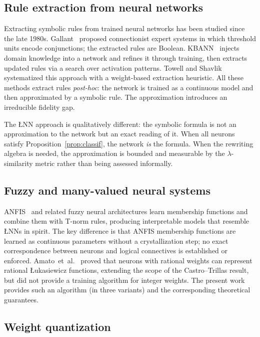 \documentclass[12pt,a4paper]{article}
\newcommand{\LNN}{\L{}NN}
\begin{document}
\subsection{Rule extraction from neural networks}

Extracting symbolic rules from trained neural networks has been studied since
the late 1980s.
Gallant~\cite{gallant1988} proposed connectionist expert systems in which
threshold units encode conjunctions; the extracted rules are Boolean.
KBANN~\cite{towell1994} injects domain knowledge into a network and refines it
through training, then extracts updated rules via a search over activation patterns.
Towell and Shavlik~\cite{towell1993} systematized this approach with a
weight-based extraction heuristic.
All these methods extract rules \emph{post-hoc}: the network is trained as a
continuous model and then approximated by a symbolic rule.
The approximation introduces an irreducible fidelity gap.

The \LNN{} approach is qualitatively different: the symbolic formula is not an
approximation to the network but an exact reading of it.
When all neurons satisfy Proposition~\ref{prop:classif}, the network \emph{is}
the formula.
When the rewriting algebra is needed, the approximation is bounded and
measurable by the $\lambda$-similarity metric rather than being assessed
informally.

\subsection{Fuzzy and many-valued neural systems}

ANFIS~\cite{jang1993} and related fuzzy neural architectures learn
membership functions and combine them with T-norm rules, producing interpretable
models that resemble \LNN{}s in spirit.
The key difference is that ANFIS membership functions are learned as continuous
parameters without a crystallization step; no exact correspondence between
neurons and logical connectives is established or enforced.
Amato~et~al.~\cite{amato2002} proved that neurons with rational weights can
represent rational \L{}ukasiewicz functions, extending the scope of the
Castro--Trillas result, but did not provide a training algorithm for integer
weights.
The present work provides such an algorithm (in three variants) and the
corresponding theoretical guarantees.

\subsection{Weight quantization}
\end{document}
